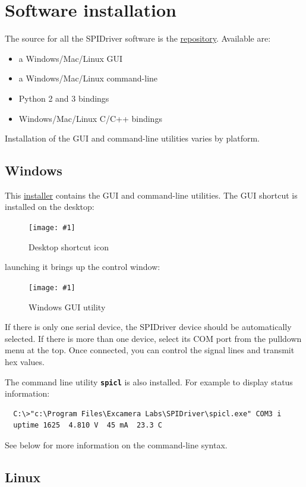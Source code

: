 \documentclass{article}
\newcommand{\png}[2]{
\begin{figure}[H]
\begin{center}
\texttt{[image: \#1]}
\caption{#2}
\end{center}
\end{figure}
}
\newcommand{\mach}[1]{\texttt{\textbf{#1}}}
\begin{document}
\section{Software installation}

The source for all the SPIDriver software is the
\href{https://github.com/jamesbowman/spidriver}{repository}.
Available are:

\begin{itemize}
\item a Windows/Mac/Linux GUI
\item a Windows/Mac/Linux command-line
\item Python 2 and 3 bindings
\item Windows/Mac/Linux C/C++ bindings
\end{itemize}

Installation of the GUI and command-line utilities varies by platform.

\subsection{Windows}

This
\href{https://github.com/jamesbowman/spidriver/releases/download/v0.1.1/spidriver-installer.exe}{installer}
contains the GUI and command-line utilities.
The GUI shortcut is installed on the desktop:

\png{img/spidriver/icon}{Desktop shortcut icon}

launching it brings up the control window:

\png{img/spidriver/gui}{Windows GUI utility}

If there is only one serial device, 
the SPIDriver device should be automatically selected.
If there is more than one device, select its COM port from the pulldown menu at the top.
Once connected, you can control the signal lines and transmit hex values.

The command line utility \mach{spicl} is also installed. For example to display status information:

\begin{lstlisting}
  C:\>"c:\Program Files\Excamera Labs\SPIDriver\spicl.exe" COM3 i
  uptime 1625  4.810 V  45 mA  23.3 C
\end{lstlisting}

See below for more information on the command-line syntax.

\subsection{Linux}
\end{document}
